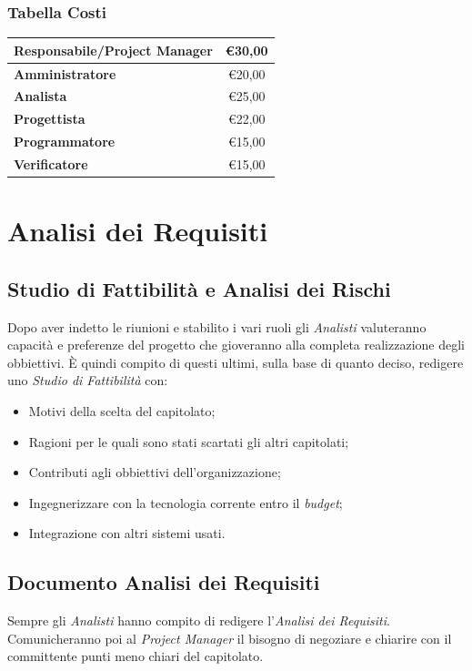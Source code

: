 \documentclass[12pt,a4paper,titlepage]{article}
\begin{document}
\subsubsection{Tabella Costi}
{\renewcommand\arraystretch{1.2}  %
	\begin{tabular}{|l|c|}
		\hline
		\textbf{Responsabile/Project Manager} & \euro 30,00 \\
		\hline
		\textbf{Amministratore} & \euro 20,00 \\
		\hline
		\textbf{Analista} & \euro 25,00 \\
		\hline
		\textbf{Progettista} & \euro 22,00 \\
		\hline
		\textbf{Programmatore} & \euro 15,00 \\
		\hline
		\textbf{Verificatore} & \euro 15,00 \\
		\hline
\end{tabular}}
\vspace{0.5cm}
\newpage
{}
\section{Analisi dei Requisiti}
\subsection{Studio di Fattibilità e Analisi dei Rischi}
Dopo aver indetto le riunioni e stabilito i vari ruoli gli \textit{Analisti} valuteranno capacità e preferenze del progetto che gioveranno alla completa realizzazione degli obbiettivi. È quindi compito di questi ultimi, sulla base di quanto deciso, redigere uno \textit{Studio di Fattibilità} con:
\begin{itemize}
	\item Motivi della scelta del capitolato;
	\item Ragioni per le quali sono stati scartati gli altri capitolati;
	\item Contributi agli obbiettivi dell'organizzazione;
	\item Ingegnerizzare con la tecnologia corrente entro il \textit{budget};
	\item Integrazione con altri sistemi usati.
\end{itemize}
\subsection{Documento Analisi dei Requisiti}
Sempre gli \textit{Analisti} hanno compito di redigere l'\textit{Analisi dei Requisiti}. Comunicheranno poi al \textit{Project Manager} il bisogno di negoziare e chiarire con il committente punti meno chiari del capitolato.
\end{document}
